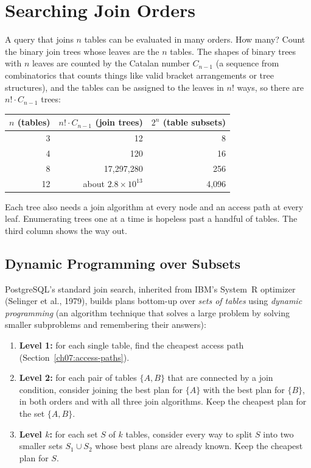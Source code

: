 \section{Searching Join Orders}
\label{ch07:join-order}

A query that joins $n$ tables can be evaluated in many orders. How many? Count the binary join trees whose leaves are the $n$ tables. The shapes of binary trees with $n$ leaves are counted by the Catalan number $C_{n-1}$ (a sequence from combinatorics that counts things like valid bracket arrangements or tree structures), and the tables can be assigned to the leaves in $n!$ ways, so there are $n! \cdot C_{n-1}$ trees:

\begin{center}
\small
\begin{tabular}{@{}rrr@{}}
\toprule
$n$ (tables) & $n! \cdot C_{n-1}$ (join trees) & $2^n$ (table subsets) \\
\midrule
3 & 12 & 8 \\
4 & 120 & 16 \\
8 & 17{,}297{,}280 & 256 \\
12 & about $2.8 \times 10^{13}$ & 4{,}096 \\
\bottomrule
\end{tabular}
\end{center}

Each tree also needs a join algorithm at every node and an access path at every leaf. Enumerating trees one at a time is hopeless past a handful of tables. The third column shows the way out.

\subsection{Dynamic Programming over Subsets}

PostgreSQL's standard join search, inherited from IBM's System~R optimizer (Selinger et al., 1979), builds plans bottom-up over \emph{sets of tables} using \emph{dynamic programming} (an algorithm technique that solves a large problem by solving smaller subproblems and remembering their answers):
\begin{enumerate}
  \item \textbf{Level 1:} for each single table, find the cheapest access path (Section~\ref{ch07:access-paths}).
  \item \textbf{Level 2:} for each pair of tables $\{A, B\}$ that are connected by a join condition, consider joining the best plan for $\{A\}$ with the best plan for $\{B\}$, in both orders and with all three join algorithms. Keep the cheapest plan for the set $\{A, B\}$.
  \item \textbf{Level $k$:} for each set $S$ of $k$ tables, consider every way to split $S$ into two smaller sets $S_1 \cup S_2$ whose best plans are already known. Keep the cheapest plan for $S$.
\end{enumerate}

